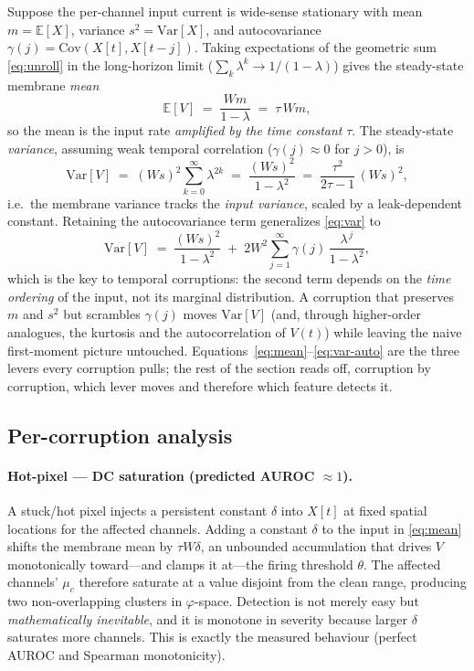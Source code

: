 Suppose the per-channel input current is wide-sense stationary with mean $m=\mathbb{E}[X]$,
variance $s^2=\mathrm{Var}[X]$, and autocovariance $\gamma(j)=\mathrm{Cov}(X[t],X[t-j])$.
Taking expectations of the geometric sum \eqref{eq:unroll} in the long-horizon limit
($\sum_k \lambda^k \to 1/(1-\lambda)$) gives the steady-state membrane \emph{mean}
%
\begin{equation}
  \mathbb{E}[V] \;=\; \frac{W m}{1-\lambda} \;=\; \tau\, W m,
  \label{eq:mean}
\end{equation}
%
so the mean is the input rate \emph{amplified by the time constant} $\tau$. The steady-state
\emph{variance}, assuming weak temporal correlation ($\gamma(j)\!\approx\!0$ for $j>0$), is
%
\begin{equation}
  \mathrm{Var}[V] \;=\; (W s)^2 \sum_{k=0}^{\infty} \lambda^{2k}
  \;=\; \frac{(W s)^2}{1-\lambda^2}
  \;=\; \frac{\tau^2}{2\tau-1}\,(W s)^2,
  \label{eq:var}
\end{equation}
%
i.e.\ the membrane variance tracks the \emph{input variance}, scaled by a leak-dependent
constant. Retaining the autocovariance term generalizes \eqref{eq:var} to
%
\begin{equation}
  \mathrm{Var}[V] \;=\; \frac{(W s)^2}{1-\lambda^2}
  \;+\; 2 W^2 \sum_{j=1}^{\infty} \gamma(j)\,\frac{\lambda^{\,j}}{1-\lambda^2},
  \label{eq:var-auto}
\end{equation}
%
which is the key to temporal corruptions: the second term depends on the \emph{time
ordering} of the input, not its marginal distribution. A corruption that preserves $m$ and
$s^2$ but scrambles $\gamma(j)$ moves $\mathrm{Var}[V]$ (and, through higher-order analogues,
the kurtosis and the autocorrelation of $V(t)$) while leaving the naive first-moment picture
untouched. Equations~\eqref{eq:mean}--\eqref{eq:var-auto} are the three levers every
corruption pulls; the rest of the section reads off, corruption by corruption, which lever
moves and therefore which feature detects it.

\subsection{Per-corruption analysis}
\label{sec:theory-percorruption}

\paragraph{Hot-pixel --- DC saturation (predicted AUROC $\approx 1$).}
A stuck/hot pixel injects a persistent constant $\delta$ into $X[t]$ at fixed spatial
locations for the affected channels. Adding a constant $\delta$ to the input in
\eqref{eq:mean} shifts the membrane mean by $\tau W \delta$, an unbounded accumulation that
drives $V$ monotonically toward---and clamps it at---the firing threshold $\theta$. The
affected channels' $\mu_c$ therefore saturate at a value disjoint from the clean range,
producing two non-overlapping clusters in $\varphi$-space. Detection is not merely easy but
\emph{mathematically inevitable}, and it is monotone in severity because larger $\delta$
saturates more channels. This is exactly the measured behaviour (perfect AUROC and Spearman
monotonicity).

